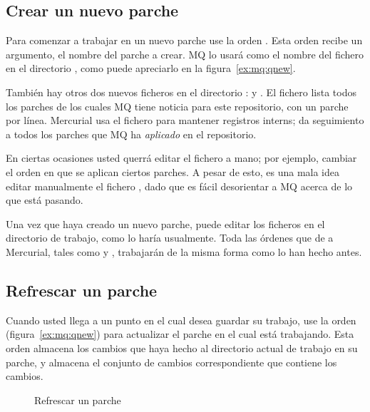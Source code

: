 \subsection{Crear un nuevo parche}

Para comenzar a trabajar en un nuevo parche use la orden
. Esta orden recibe un argumento, el nombre del
parche a crear.  MQ lo usará como el nombre del fichero en el
directorio , como puede apreciarlo en la
figura~\ref{ex:mq:qnew}.

También hay otros dos nuevos ficheros en el directorio
:   y .  El
fichero  lista todos los parches de los cuales MQ
tiene noticia para este repositorio, con un parche por línea.
Mercurial usa el fichero  para mantener registros
interns; da seguimiento a todos los parches que MQ ha \emph{aplicado}
en el repositorio.

\begin{note}
  En ciertas ocasiones usted querrá editar el fichero
   a mano; por ejemplo, cambiar el orden en que se
  aplican ciertos parches.  A pesar de esto, es una mala idea editar
  manualmente  el fichero , dado que es fácil
  desorientar a MQ acerca de lo que está pasando.
\end{note}

Una vez que haya creado un nuevo parche, puede editar los ficheros en
el directorio de trabajo, como lo haría usualmente.  Toda las órdenes
que de a Mercurial, tales como  y ,
trabajarán de la misma forma como lo han hecho antes.

\subsection{Refrescar un parche}

Cuando usted llega a un punto en el cual desea guardar su trabajo, use
la orden (figura~\ref{ex:mq:qnew}) para
actualizar el parche en el cual está trabajando.  Esta orden almacena
los cambios que haya hecho al directorio actual de trabajo en su
parche, y almacena el conjunto de cambios correspondiente que contiene
los cambios.

\begin{figure}[ht]
  \caption{Refrescar un parche}
  \label{ex:mq:qrefresh}
\end{figure}

